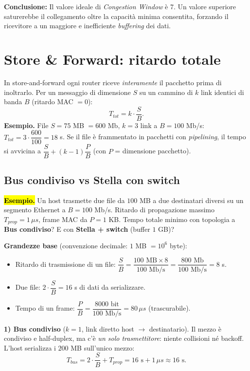 \documentclass[11pt,a4paper]{report}
\begin{document}
\textbf{Conclusione:} Il valore ideale di \textit{Congestion Window} è 7. Un valore superiore saturerebbe il collegamento oltre la capacità minima consentita, forzando il ricevitore a un maggiore e inefficiente \textit{buffering} dei dati.

\section{Store \& Forward: ritardo totale}
\label{teoria:storefwd}
In store-and-forward ogni router riceve \emph{interamente} il pacchetto prima di inoltrarlo. Per un messaggio di dimensione $S$ su un cammino di $k$ link identici di banda $B$ (ritardo MAC $=0$):
\[ T_{tot}=k\cdot\frac{S}{B}. \]
\textbf{Esempio.} File $S=75$ MB $=600$ Mb, $k=3$ link a $B=100$ Mb/s: $T_{tot}=3\cdot\dfrac{600}{100}=18$ s. Se il file è frammentato in pacchetti con \emph{pipelining}, il tempo si avvicina a $\dfrac{S}{B}+(k-1)\dfrac{P}{B}$ (con $P$ = dimensione pacchetto).

\subsection{Bus condiviso vs Stella con switch}
\hl{\textbf{Esempio.}} Un host trasmette due file da $100$ MB a due destinatari
diversi su un segmento Ethernet a $B=100$ Mb/s. Ritardo di propagazione massimo
$T_{prop}=1\,\mu s$, frame MAC da $P=1$ KB. Tempo totale minimo con topologia a
\textbf{Bus condiviso}? E con \textbf{Stella + switch} (buffer $1$ GB)?

\medskip
\textbf{Grandezze base} (convenzione decimale: $1$ MB $=10^6$ byte):
\begin{itemize}
    \item Ritardo di trasmissione di un file:
    $\dfrac{S}{B}=\dfrac{100\text{ MB}\times 8}{100\text{ Mb/s}}
    =\dfrac{800\text{ Mb}}{100\text{ Mb/s}}=8$ s.
    \item Due file: $2\cdot\dfrac{S}{B}=16$ s di dati da serializzare.
    \item Tempo di un frame: $\dfrac{P}{B}=\dfrac{8000\text{ bit}}{100\text{ Mb/s}}
    =80\,\mu s$ (trascurabile).
\end{itemize}

\textbf{1) Bus condiviso} ($k=1$, link diretto host $\to$ destinatario).
Il mezzo è condiviso e half-duplex, ma c'è \emph{un solo trasmettitore}: niente
collisioni né backoff. L'host serializza i $200$ MB sull'unico mezzo:
\[
T_{bus}=2\cdot\frac{S}{B}+T_{prop}=16\text{ s}+1\,\mu s \approx 16\text{ s}.
\]
\end{document}
